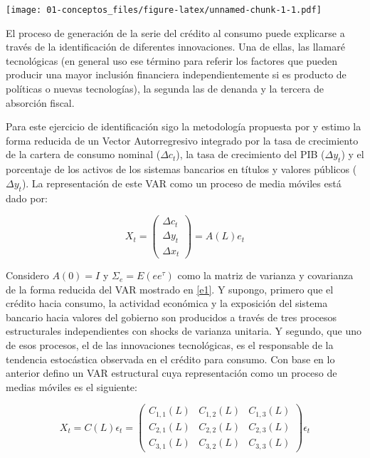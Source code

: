 \documentclass[
]{book}
\begin{document}
\texttt{[image: 01-conceptos\_files/figure-latex/unnamed-chunk-1-1.pdf]}

El proceso de generación de la serie del crédito al consumo puede explicarse a través de la identificación de diferentes innovaciones. Una de ellas, las llamaré tecnológicas (en general uso ese término para referir los factores que pueden producir una mayor inclusión financiera independientemente si es producto de políticas o nuevas tecnologías), la segunda las de denanda y la tercera de absorción fiscal.

Para este ejercicio de identificación sigo la metodología propuesta por \citet{BLANCHARD88} y estimo la forma reducida de un Vector Autorregresivo integrado por la tasa de crecimiento de la cartera de consumo nominal (\(\Delta c_{t}\)), la tasa de crecimiento del PIB (\(\Delta y_{t}\)) y el porcentaje de los activos de los sistemas bancarios en títulos y valores públicos (\(\Delta y_{t}\)). La representación de este VAR como un proceso de media móviles está dado por:

\begin{equation}
X_{t}=\left( \begin{array}{c}
\Delta c_{t} \\
\Delta y_{t} \\
\Delta x_{t} 
\end{array}
\right)=A(L)e_{t}
\label{e1}
\end{equation}

Considero \(A(0)=I\) y \(\Sigma_e=E(e e^{\tau})\) como la matriz de varianza y covarianza de la forma reducida del VAR mostrado en \ref{e1}. Y supongo, primero que el crédito hacia consumo, la actividad económica y la exposición del sistema bancario hacia valores del gobierno son producidos a través de tres procesos estructurales independientes con shocks de varianza unitaria. Y segundo, que uno de esos procesos, el de las innovaciones tecnológicas, es el responsable de la tendencia estocástica observada en el crédito para consumo. Con base en lo anterior defino un VAR estructural cuya representación como un proceso de medias móviles es el siguiente:

\begin{equation}
X_{t}=C(L)\epsilon_{t}=\left( \begin{array}{ccc}
C_{1,1}(L) & C_{1,2}(L) & C_{1,3}(L)\\
C_{2,1}(L) & C_{2,2}(L) & C_{2,3}(L)\\
C_{3,1}(L) & C_{3,2}(L) & C_{3,3}(L)
\end{array}
\right)\epsilon_{t}
\label{e2}
\end{equation}
\end{document}
